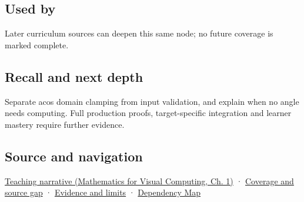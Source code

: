 \subsection{Used by}\label{appendix-e569e60e18e6-used-by}

\hypertarget{appendix-e569e60e18e6-used-by}{}

Later curriculum sources can deepen this same node; no future coverage is marked complete.

\subsection{Recall and next depth}\label{appendix-e569e60e18e6-recall-and-next-depth}

\hypertarget{appendix-e569e60e18e6-recall-and-next-depth}{}

Separate acos domain clamping from input validation, and explain when no angle needs computing. Full production proofs, target-specific integration and learner mastery require further evidence.

\subsection{Source and navigation}\label{appendix-e569e60e18e6-source-and-navigation}

\hypertarget{appendix-e569e60e18e6-source-and-navigation}{}

\href{../02-Mathematics-for-Visual-Computing/main.pdf\#nameddest=01-foundations-i-ch017-an-angle-is-a-question-with-a-domain}{Teaching narrative (Mathematics for Visual Computing, Ch. 1)} · \hyperref[appendix-fd090d982a15-phase-6---parts-501-600]{Coverage and source gap} · \hyperref[appendix-a103e7846d21-phase-6---source-analysis-and-verification]{Evidence and limits} · \hyperref[appendix-4ad47bdd269a]{Dependency Map}
